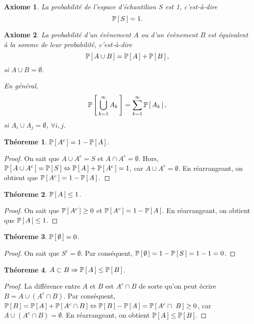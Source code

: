 \documentclass[11pt]{article}
\renewcommand\P[1]{%
	\ensuremath{%
		\mathbb{P}\left[\,#1\,\right]%
	}%
}%
\newtheorem{axiome}{Axiome}
\newtheorem{theoreme}{Théoreme}[section]
\theoremstyle{remark}
\theoremstyle{definition}
\begin{document}
\begin{axiome}
	La probabilité de l'espace d'échantilion $S$ est 1, c'est-à-dire
	\begin{equation*}
		\P{S}=1.
	\end{equation*}
\end{axiome}

\begin{axiome}
	La probabilité d'un évènement $A$ ou d'un évènement $B$ est équivalent à la
	somme de leur probabilité, c'est-à-dire
	\begin{equation*}
		\P{A\cup B}=\P{A}+\P{B},
	\end{equation*}
	si $A\cup B=\emptyset$.

	En général, 
	\begin{equation*}
		\P{\bigcup_{k=1}^\infty A_k}=\sum_{k=1}^\infty\P{A_k},
	\end{equation*}
	si $A_i\cup A_j=\emptyset$, $\forall i,j$.
\end{axiome}

\begin{theoreme}
	$\P{A^c}=1-\P{A}$.
\end{theoreme}

\begin{proof}
	On sait que $A\cup A^c=S$ et $A\cap A^c=\emptyset$. Hors,
	$\P{A\cup A^c}=\P{S}\Leftrightarrow\P{A}+\P{A^c}=1$, car
	$A\cup A^c=\emptyset$.
	En réarrangeant, on obtient que $\P{A^c}=1-\P{A}.$
\end{proof}

\begin{theoreme}
	$\P{A}\leq 1$.
\end{theoreme}

\begin{proof}
	On sait que $\P{A^c}\geq 0$ et $\P{A^c}=1-\P{A}$. En réarrangeant, on
	obtient que $\P{A}\leq 1$.
\end{proof}

\begin{theoreme}
	$\P{\emptyset}=0$.
\end{theoreme}

\begin{proof}
	On sait que $S^c=\emptyset$. Par conséquent, $\P{\emptyset}=1-\P{S}=1-1=0$.
\end{proof}

\begin{theoreme}
	$A\subset B\Rightarrow \P{A}\leq\P{B}$.
\end{theoreme}

\begin{proof}
	La différence entre $A$ et $B$ est $A^c\cap B$ de sorte qu'on peut écrire
	$B=A\cup(A^c\cap B)$. Par conséquent, $\P{B}=\P{A}+\P{A^c\cap B}
	\Leftrightarrow\P{B}-\P{A}=\P{A^c\cap B}\geq 0$, car
	$A\cup(A^c\cap B)=\emptyset$. En réarrangeant, on obtient $\P{A}\leq\P{B}$.
\end{proof}
\end{document}
